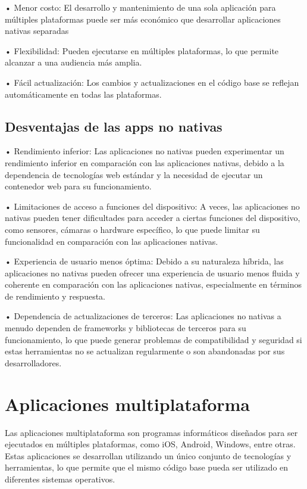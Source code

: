 \documentclass{article}
\begin{document}
\begin{multicols}{2}
		• Menor costo: El desarrollo y mantenimiento de una sola aplicación para múltiples plataformas puede ser más económico que desarrollar aplicaciones nativas separadas
		
		• Flexibilidad: Pueden ejecutarse en múltiples plataformas, lo que permite alcanzar a una audiencia más amplia.
		
		• Fácil actualización: Los cambios y actualizaciones en el código base se reflejan automáticamente en todas las plataformas.

		\subsection{Desventajas de las apps no nativas}
    	• Rendimiento inferior: Las aplicaciones no nativas pueden experimentar un rendimiento inferior en comparación con las aplicaciones nativas, debido a la dependencia de tecnologías web estándar y la necesidad de ejecutar un contenedor web para su funcionamiento.

		• Limitaciones de acceso a funciones del dispositivo: A veces, las aplicaciones no nativas pueden tener dificultades para acceder a ciertas funciones del dispositivo, como sensores, cámaras o hardware específico, lo que puede limitar su funcionalidad en comparación con las aplicaciones nativas.

		• Experiencia de usuario menos óptima: Debido a su naturaleza híbrida, las aplicaciones no nativas pueden ofrecer una experiencia de usuario menos fluida y coherente en comparación con las aplicaciones nativas, especialmente en términos de rendimiento y respuesta.

		• Dependencia de actualizaciones de terceros: Las aplicaciones no nativas a menudo dependen de frameworks y bibliotecas de terceros para su funcionamiento, lo que puede generar problemas de compatibilidad y seguridad si estas herramientas no se actualizan regularmente o son abandonadas por sus desarrolladores.
		
		\section{Aplicaciones multiplataforma}
		Las aplicaciones multiplataforma son programas informáticos diseñados para ser ejecutados en múltiples plataformas, como iOS, Android, Windows, entre otras. Estas aplicaciones se desarrollan utilizando un único conjunto de tecnologías y herramientas, lo que permite que el mismo código base pueda ser utilizado en diferentes sistemas operativos.
	

\end{multicols}
\end{document}
